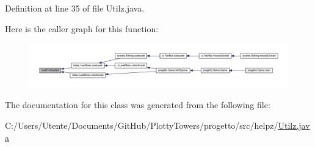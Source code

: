 Definition at line 35 of file Utilz.\+java.

Here is the caller graph for this function\+:\nopagebreak
\begin{figure}[H]
\begin{center}
\leavevmode
\includegraphics[width=350pt]{classhelpz_1_1_utilz_a3a92fdb2e1e33fa3daadbdea23200fcc_icgraph}
\end{center}
\end{figure}


The documentation for this class was generated from the following file\+:\begin{DoxyCompactItemize}
\item 
C\+:/\+Users/\+Utente/\+Documents/\+Git\+Hub/\+Plotty\+Towers/progetto/src/helpz/\hyperlink{_utilz_8java}{Utilz.\+java}\end{DoxyCompactItemize}

